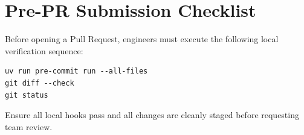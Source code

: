 \documentclass[11pt,a4paper]{article}
\begin{document}
\section{Pre-PR Submission Checklist}
Before opening a Pull Request, engineers must execute the following local verification sequence:
\begin{lstlisting}
uv run pre-commit run --all-files
git diff --check
git status
\end{lstlisting}
Ensure all local hooks pass and all changes are cleanly staged before requesting team review.
\end{document}
